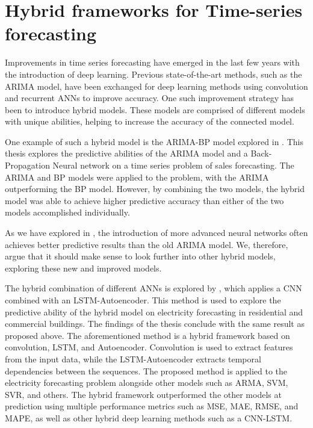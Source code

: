 \section{Hybrid frameworks for Time-series forecasting}
\label{section:RelatedWork:Hybrid}

Improvements in time series forecasting have emerged in the last few years with the introduction of deep learning.
Previous state-of-the-art methods, such as the ARIMA model, have been exchanged for deep learning methods using convolution and recurrent ANNs to improve accuracy.
One such improvement strategy has been to introduce hybrid models.
These models are comprised of different models with unique abilities, helping to increase the accuracy of the connected model.


One example of such a hybrid model is the ARIMA-BP model explored in \cite{Bowen2020}.
This thesis explores the predictive abilities of the ARIMA model and a Back-Propagation Neural network on a time series problem of sales forecasting.
The ARIMA and BP models were applied to the problem, with the ARIMA outperforming the BP model.
However, by combining the two models, the hybrid model was able to achieve higher predictive accuracy than either of the two models accomplished individually.

As we have explored in , the introduction of more advanced neural networks often achieves better predictive results than the old ARIMA model.
We, therefore, argue that it should make sense to look further into other hybrid models, exploring these new and improved models.


The hybrid combination of different ANNs is explored by \cite{Khan2020}, which applies a CNN combined with an LSTM-Autoencoder.
This method is used to explore the predictive ability of the hybrid model on electricity forecasting in residential and commercial buildings.
The findings of the thesis conclude with the same result as proposed above.
The aforementioned method is a hybrid framework based on convolution, LSTM, and Autoencoder.
Convolution is used to extract features from the input data, while the LSTM-Autoencoder extracts temporal dependencies between the sequences.
The proposed method is applied to the electricity forecasting problem alongside other models such as ARMA, SVM, SVR, and others.
The hybrid framework outperformed the other models at prediction using multiple performance metrics such as MSE, MAE, RMSE, and MAPE,
as well as other hybrid deep learning methods such as a CNN-LSTM.


